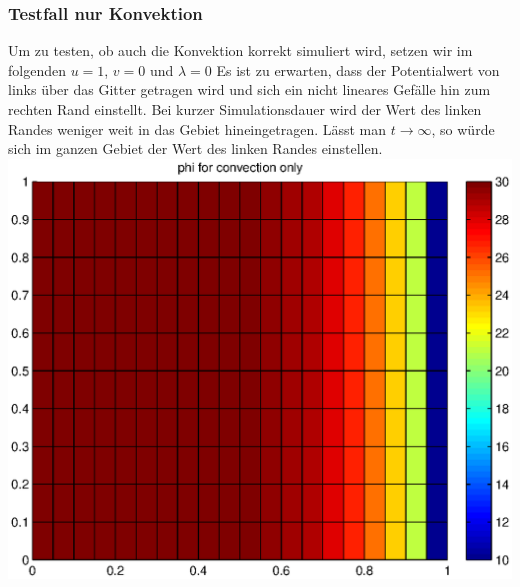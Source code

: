 \documentclass{article}
\begin{document}
\subsubsection{Testfall nur Konvektion}
Um zu testen, ob auch die Konvektion korrekt simuliert wird, setzen wir im folgenden $u=1$, $v=0$ und $\lambda=0$
Es ist zu erwarten, dass der Potentialwert von links über das Gitter getragen wird und sich ein nicht lineares Gefälle hin 
zum rechten Rand einstellt. Bei kurzer Simulationsdauer wird der Wert des linken Randes weniger weit in das Gebiet hineingetragen.
Lässt man $t \rightarrow \infty$, so würde sich im ganzen Gebiet der Wert des linken Randes einstellen. 
\includegraphics[scale=0.4]{test/5conv/convonly.eps}
\end{document}
